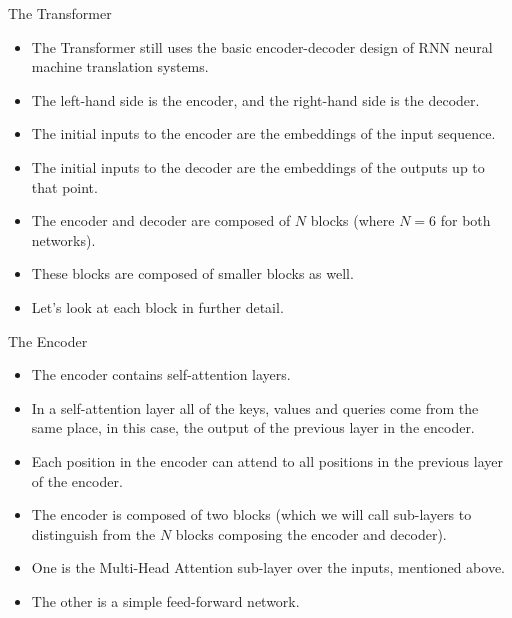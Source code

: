 \documentclass[handout]{beamer}
\begin{document}
\begin{frame}{The Transformer}
\begin{scriptsize}
\begin{itemize}

 \item  The Transformer still uses the basic encoder-decoder design of RNN neural machine translation systems.
 
 \item The left-hand side is the encoder, and the right-hand side is the decoder. 
 
 \item The initial inputs to the encoder are the embeddings of the input sequence.
 \item The initial inputs to the decoder are the embeddings of the outputs up to that point. 
 
 \item The encoder and decoder are composed of $N$ blocks (where $N = 6$ for both networks).
 
 \item These blocks are composed of smaller blocks as well. 
 
 \item Let's look at each block in further detail.
 
\end{itemize}

\end{scriptsize}

\end{frame}



\begin{frame}{The Encoder}
\begin{scriptsize}
\begin{itemize}

\item The encoder contains self-attention layers. 

\item In a self-attention layer all of the keys, values and queries come from the same place, in this case, the output of the previous layer in the encoder. 

\item Each position in the encoder can attend to all positions in the previous layer of the encoder.

 \item  The encoder is composed of two blocks (which we will call sub-layers to distinguish from the $N$ blocks composing the encoder and decoder).
\item  One is the Multi-Head Attention sub-layer over the inputs, mentioned above. 
\item The other is a simple feed-forward network. 

\end{itemize}

\end{scriptsize}

\end{frame}
\end{document}
